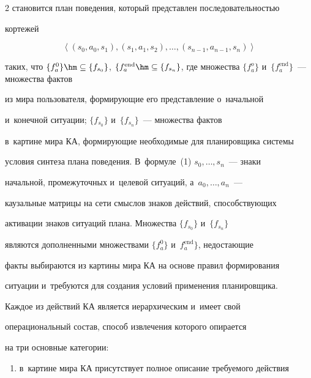 \begin{multicols}{2}
становится план поведения, который пред\-став\-лен по\-сле\-до\-ва\-тель\-ностью 

кортежей

  \begin{equation}

  \left\langle \left( s_0, a_0,s_1\right), \left( s_1, a_1, s_2\right),\ldots , \left( s_{n-1}, 

a_{n-1}, s_n\right)\right\rangle

  \label{e1-sm}

  \end{equation}

таких, что $\{f_a^0\} \hm\subseteq \{ f_{s_0}\}$, $\{f_a^{\mathrm{end}}\hm\subseteq 

\{f_{s_n}\}$, где множества $\{f_a^o\}$ и~$\{f_a^{\mathrm{end}}\}$~--- множества фак\-тов 

из мира пользователя, формирующие его пред\-став\-ле\-ние о~начальной 

и~конечной ситуации;  $\{f_{s_0}\}$ и~$\{f_{s_n}\}$~--- множества фак\-тов 

в~картине мира КА, формирующие необходимые для планировщика системы 

условия синтеза плана поведения. В~формуле~(1) $s_0,\ldots , s_n$~--- знаки 

начальной, промежуточных и~целевой ситуаций, а~$a_0,\ldots , a_n$~--- 

каузальные матрицы на сети смыс\-лов знаков действий, спо\-соб\-ст\-ву\-ющих 

активации знаков ситуаций плана. Множества $\{f_{s_0}\}$ и~$\{f_{s_n}\}$ 

являются дополненными множествами $\{f_a^0\}$ и~$f_a^{\mathrm{end}}\}$, недостающие 

факты выбираются из картины мира КА на основе правил формирования 

ситуации и~требуются для создания условий применения планировщика.

  

  Каждое из действий КА является иерархическим и~имеет свой 

операциональный со\-став, способ извлечения которого опирается 

на три основные категории:

  \begin{enumerate}[(1)]

\item в~картине мира КА присутствует полное описание требуемого действия 


\end{enumerate}
\end{multicols}
